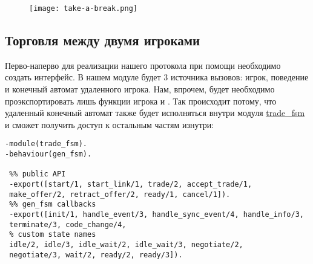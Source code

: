 \begin{figure}[H]
    \centering
    \texttt{[image: take-a-break.png]}
\end{figure}
\subsection{Торговля между двумя игроками}
\label{game-trading-between-two-players}
Перво\--наперво для реализации нашего протокола при помощи  необходимо создать интерфейс.
В нашем модуле будет 3 источника вызовов: игрок, поведение  и конечный автомат удаленного игрока.
Нам, впрочем, будет необходимо проэкспортировать лишь функции игрока и .
Так происходит потому, что удаленный конечный автомат также будет исполняться внутри модуля \href{http://learnyousomeerlang.com/static/erlang/trade\_fsm.erl}{trade\_fsm} и сможет получить доступ к остальным частям изнутри:

\begin{lstlisting}[style=erlang]
-module(trade_fsm).
-behaviour(gen_fsm).
 
 %% public API
 -export([start/1, start_link/1, trade/2, accept_trade/1,
 make_offer/2, retract_offer/2, ready/1, cancel/1]).
 %% gen_fsm callbacks
 -export([init/1, handle_event/3, handle_sync_event/4, handle_info/3,
 terminate/3, code_change/4,
 % custom state names
 idle/2, idle/3, idle_wait/2, idle_wait/3, negotiate/2,
 negotiate/3, wait/2, ready/2, ready/3]).
\end{lstlisting}

